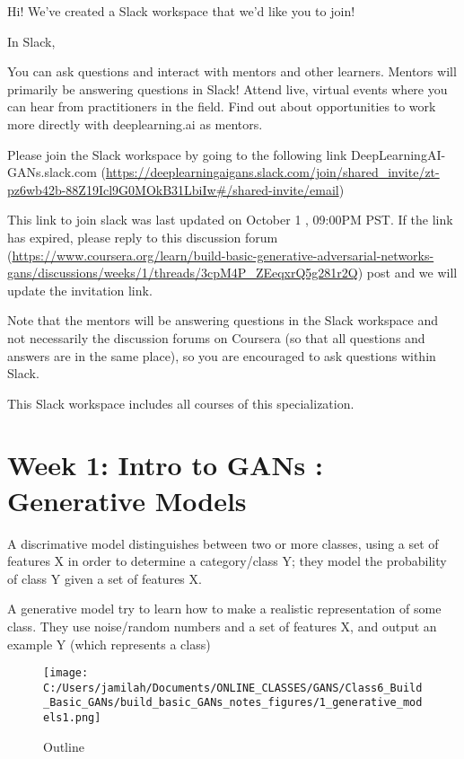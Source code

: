 \documentclass[11pt, onecolumn]{article}
\begin{document}
Hi! We've created a Slack workspace that we'd like you to join!

In Slack,

    You can ask questions and interact with mentors and other learners. Mentors will primarily be answering questions in Slack!
    Attend live, virtual events where you can hear from practitioners in the field.
    Find out about opportunities to work more directly with deeplearning.ai as mentors.

Please join the Slack workspace by going to the following link DeepLearningAI-GANs.slack.com (\url{https://deeplearningaigans.slack.com/join/shared_invite/zt-pz6wb42b-88Z19Icl9G0MOkB31LbiIw#/shared-invite/email})

This link to join slack was last updated on October 1 , 09:00PM PST.  If the link has expired, please reply to this discussion forum (\url{https://www.coursera.org/learn/build-basic-generative-adversarial-networks-gans/discussions/weeks/1/threads/3cpM4P_ZEeqxrQ5g281r2Q}) post and we will update the invitation link.

Note that the mentors will be answering questions in the Slack workspace and not necessarily the discussion forums on Coursera (so that all questions and answers are in the same place), so you are encouraged to ask questions within Slack.

This Slack workspace includes all courses of this specialization.

\section{Week 1: Intro to GANs : Generative Models}

A discrimative model distinguishes between two or more classes, using a set of features X in order to determine a category/class Y; they model the probability of class Y given a set of features X.

A generative model try to learn how to make a realistic representation of some class.  They use noise/random numbers and a set of features X, and output an example Y (which represents a class) 

\begin{figure}[htp]
\begin{center}
\texttt{[image: C:/Users/jamilah/Documents/ONLINE\_CLASSES/GANS/Class6\_Build\_Basic\_GANs/build\_basic\_GANs\_notes\_figures/1\_generative\_models1.png]}
\end{center}
\caption{Outline}
\label{1_generative_models1}
\end{figure}
\end{document}
